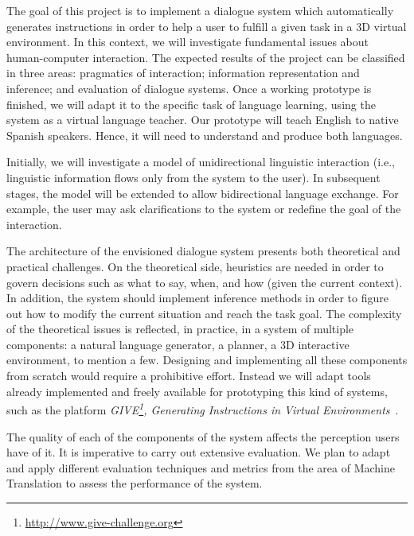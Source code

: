 
The goal of this project is to implement a dialogue system which automatically
generates instructions in order to help a user to fulfill a
given task in a 3D virtual environment. In this context, we will investigate
fundamental issues about human-computer interaction. The expected results of the
project can be classified in three areas: pragmatics
of interaction;  information representation and inference; and evaluation of
dialogue systems. Once a working prototype is finished, we will adapt it to
the specific task of language learning, using the system as a virtual language
teacher. Our prototype will teach English to native Spanish speakers. Hence, it
will need to understand and produce both languages.

Initially, we will investigate a model of unidirectional linguistic
interaction (i.e., linguistic information flows only from the system to the
user). In subsequent stages, the model will be
extended to allow bidirectional language exchange. For example, the user may
ask clarifications to the system or redefine the goal of the interaction.

The architecture of the envisioned dialogue system presents both theoretical and
practical challenges. On the theoretical side, heuristics are needed in order to
govern
decisions such as what to say, when, and how (given the current
context). In addition, the system should implement inference methods in order
to figure out how to modify the current situation and reach the task goal.
The complexity of
the theoretical issues is reflected, in practice, in a system of
multiple components: a natural language generator, a planner,
a 3D interactive environment, to mention a few. Designing
and implementing all these components from scratch would 
require a prohibitive effort. Instead we will adapt tools already implemented 
and freely available for prototyping this kind of 
systems, such as the platform
\emph{GIVE\footnote{\url{http://www.give-challenge.org}}, Generating
Instructions in Virtual
Environments}~\cite{byron09}. 

The quality of each of the components of the system affects the
perception users have of it. It is imperative to carry out 
extensive evaluation. 
We plan to adapt and apply different evaluation techniques and
metrics from the area of Machine Translation to assess the  
performance of the system.
